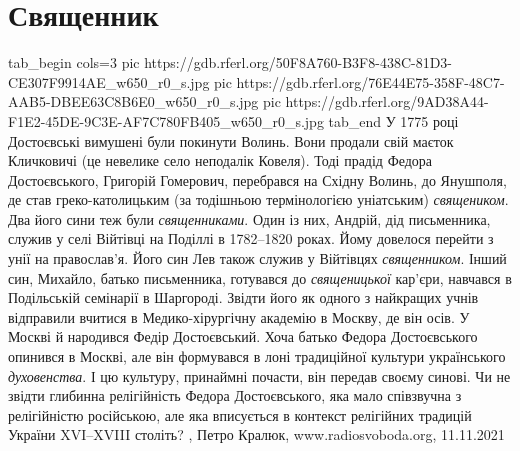  
 
 
 
 
\chapter{Священник}
\label{sec:slova.svjaschennik}

\ifcmt
  tab_begin cols=3
     pic https://gdb.rferl.org/50F8A760-B3F8-438C-81D3-CE307F9914AE_w650_r0_s.jpg
     pic https://gdb.rferl.org/76E44E75-358F-48C7-AAB5-DBEE63C8B6E0_w650_r0_s.jpg
		 pic https://gdb.rferl.org/9AD38A44-F1E2-45DE-9C3E-AF7C780FB405_w650_r0_s.jpg
  tab_end
\fi
У 1775 році Достоєвські вимушені були покинути Волинь. Вони продали свій маєток
Кличковичі (це невелике село неподалік Ковеля).  Тоді прадід Федора
Достоєвського, Григорій Гомерович, перебрався на Східну Волинь, до Янушполя, де
став греко-католицьким (за тодішньою термінологією уніатським) \emph{священиком}. Два
його сини теж були \emph{священниками}. Один із них, Андрій, дід письменника, служив у
селі Війтівці на Поділлі в 1782–1820 роках.  Йому довелося перейти з унії на
православ’я. Його син Лев також служив у Війтівцях \emph{священником}. Інший син,
Михайло, батько письменника, готувався до \emph{священицької} кар’єри, навчався в
Подільській семінарії в Шаргороді. Звідти його як одного з найкращих учнів
відправили вчитися в Медико-хірургічну академію в Москву, де він осів. У Москві
й народився Федір Достоєвський. Хоча батько Федора Достоєвського опинився в
Москві, але він формувався в лоні традиційної культури українського
\emph{духовенства}. І цю культуру, принаймні почасти, він передав своєму синові. Чи не
звідти глибинна релігійність Федора Достоєвського, яка мало співзвучна з
релігійністю російською, але яка вписується в контекст релігійних традицій
України XVI–XVIII століть?
, 
Петро Кралюк, www.radiosvoboda.org, 11.11.2021
